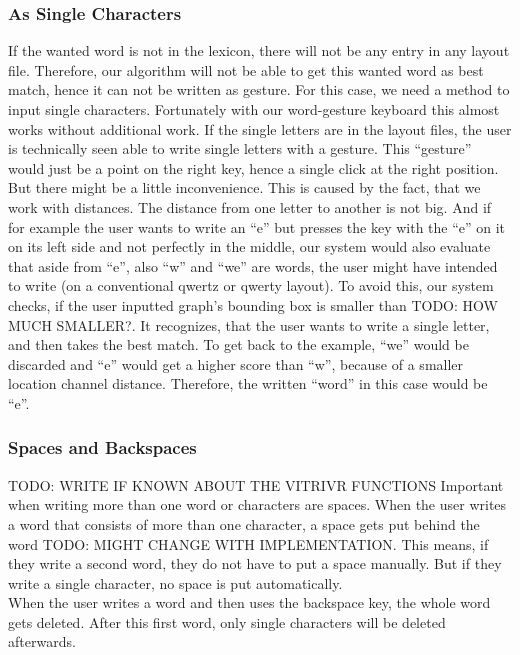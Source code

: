 \subsubsection{As Single Characters}
If the wanted word is not in the lexicon, there will not be any entry in any layout file. Therefore, our algorithm will not be able to get this wanted word as best match, hence it can not be written as gesture. For this case, we need a method to input single characters. Fortunately with our word-gesture keyboard this almost works without additional work. If the single letters are in the layout files, the user is technically seen able to write single letters with a gesture. This ``gesture'' would just be a point on the right key, hence a single click at the right position. But there might be a little inconvenience. This is caused by the fact, that we work with distances. The distance from one letter to another is not big. And if for example the user wants to write an ``e'' but presses the key with the ``e'' on it on its left side and not perfectly in the middle, our system would also evaluate that aside from ``e'', also ``w'' and ``we'' are words, the user might have intended to write (on a conventional qwertz or qwerty layout). To avoid this, our system checks, if the user inputted graph's bounding box is smaller than TODO: HOW MUCH SMALLER?. It recognizes, that the user wants to write a single letter, and then takes the best match. To get back to the example, ``we'' would be discarded and ``e'' would get a higher score than ``w'', because of a smaller location channel distance. Therefore, the written ``word'' in this case would be ``e''.

\subsubsection{Spaces and Backspaces} TODO: WRITE IF KNOWN ABOUT THE VITRIVR FUNCTIONS
Important when writing more than one word or characters are spaces. When the user writes a word that consists of more than one character, a space gets put behind the word TODO: MIGHT CHANGE WITH IMPLEMENTATION. This means, if they write a second word, they do not have to put a space manually. But if they write a single character, no space is put automatically.\\
When the user writes a word and then uses the backspace key, the whole word gets deleted. After this first word, only single characters will be deleted afterwards.


